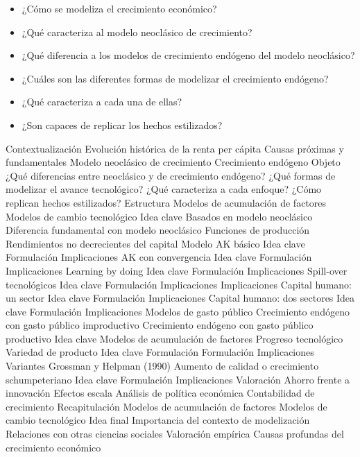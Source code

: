\documentclass{nuevotema}
\begin{document}
\ideaclave

\begin{itemize}
	\item ¿Cómo se modeliza el crecimiento económico?
	\item ¿Qué caracteriza al modelo neoclásico de crecimiento?
	\item ¿Qué diferencia a los modelos de crecimiento endógeno del modelo neoclásico?
	\item ¿Cuáles son las diferentes formas de modelizar el crecimiento endógeno?
	\item ¿Qué caracteriza a cada una de ellas?
	\item ¿Son capaces de replicar los hechos estilizados?
\end{itemize}

\esquemacorto

\begin{esquema}[enumerate]
	\1[] 
		\2 Contextualización
			\3 Evolución histórica de la renta per cápita
			\3 Causas próximas y fundamentales
			\3 Modelo neoclásico de crecimiento
			\3 Crecimiento endógeno
		\2 Objeto
			\3 ¿Qué diferencias entre neoclásico y de crecimiento endógeno?
			\3 ¿Qué formas de modelizar el avance tecnológico?
			\3 ¿Qué caracteriza a cada enfoque?
			\3 ¿Cómo replican hechos estilizados?
		\2 Estructura
			\3 Modelos de acumulación de factores
			\3 Modelos de cambio tecnológico
	\1 
		\2 Idea clave
			\3 Basados en modelo neoclásico
			\3 Diferencia fundamental con modelo neoclásico
			\3 Funciones de producción
			\3 Rendimientos no decrecientes del capital
		\2 Modelo AK básico
			\3 Idea clave
			\3 Formulación
			\3 Implicaciones
		\2 AK con convergencia
			\3 Idea clave
			\3 Formulación
			\3 Implicaciones
		\2 Learning by doing
			\3 Idea clave
			\3 Formulación
			\3 Implicaciones
		\2 Spill-over tecnológicos
			\3 Idea clave
			\3 Formulación
			\3 Implicaciones
			\3 Implicaciones
		\2 Capital humano: un sector
			\3 Idea clave
			\3 Formulación
			\3 Implicaciones
		\2 Capital humano: dos sectores
			\3 Idea clave
			\3 Formulación
			\3 Implicaciones
		\2 Modelos de gasto público
			\3 Crecimiento endógeno con gasto público improductivo
			\3 Crecimiento endógeno con gasto público productivo
	\1 
		\2 Idea clave
			\3 Modelos de acumulación de factores
			\3 Progreso tecnológico
		\2 Variedad de producto
			\3 Idea clave
			\3 Formulación
			\3 Formulación
			\3 Implicaciones
			\3 Variantes
			\3 Grossman y Helpman (1990)
		\2 Aumento de calidad o crecimiento schumpeteriano
			\3 Idea clave
			\3 Formulación
			\3 Implicaciones
		\2 Valoración
			\3 Ahorro frente a innovación
			\3 Efectos escala
			\3 Análisis de política económica
			\3 Contabilidad de crecimiento
	\1[] 
		\2 Recapitulación
			\3 Modelos de acumulación de factores
			\3 Modelos de cambio tecnológico
		\2 Idea final
			\3 Importancia del contexto de modelización
			\3 Relaciones con otras ciencias sociales
			\3 Valoración empírica
			\3 Causas profundas del crecimiento económico

\end{esquema}
\end{document}
